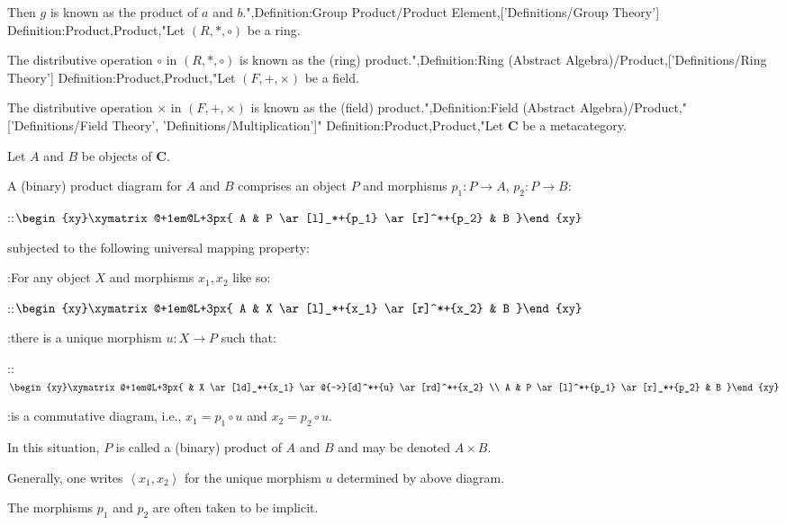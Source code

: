 Then $g$ is known as the product of $a$ and $b$.",Definition:Group Product/Product Element,['Definitions/Group Theory']
Definition:Product,Product,"Let $\left( R, *, \circ \right)$ be a ring.


The distributive operation $\circ$ in $\left( R, *, \circ \right)$ is known as the (ring) product.",Definition:Ring (Abstract Algebra)/Product,['Definitions/Ring Theory']
Definition:Product,Product,"Let $\left( F, +, \times \right)$ be a field.


The distributive operation $\times$ in $\left( F, +, \times \right)$ is known as the (field) product.",Definition:Field (Abstract Algebra)/Product,"['Definitions/Field Theory', 'Definitions/Multiplication']"
Definition:Product,Product,"Let $\mathbf C$ be a metacategory.

Let $A$ and $B$ be objects of $\mathbf C$.


A (binary) product diagram for $A$ and $B$ comprises an object $P$ and morphisms $p_1: P \to A$, $p_2: P \to B$:

::$\begin{xy}\xymatrix@+1em@L+3px{
 A
&
 P
  \ar[l]_*+{p_1}
  \ar[r]^*+{p_2}
&
 B
}\end{xy}$

subjected to the following universal mapping property:


:For any object $X$ and morphisms $x_1, x_2$ like so:

::$\begin{xy}\xymatrix@+1em@L+3px{
 A
&
 X
  \ar[l]_*+{x_1}
  \ar[r]^*+{x_2}
&
 B
}\end{xy}$

:there is a unique morphism $u: X \to P$ such that:

::$\begin{xy}\xymatrix@+1em@L+3px{
&
 X
  \ar[ld]_*+{x_1}
  \ar@{-->}[d]^*+{u}
  \ar[rd]^*+{x_2}

\\
 A
&
 P
  \ar[l]^*+{p_1}
  \ar[r]_*+{p_2}
&
 B
}\end{xy}$

:is a commutative diagram, i.e., $x_1 = p_1 \circ u$ and $x_2 = p_2 \circ u$.


In this situation, $P$ is called a (binary) product of $A$ and $B$ and may be denoted $A \times B$.

Generally, one writes $\left\langle{x_1, x_2}\right\rangle$ for the unique morphism $u$ determined by above diagram.


The morphisms $p_1$ and $p_2$ are often taken to be implicit.

